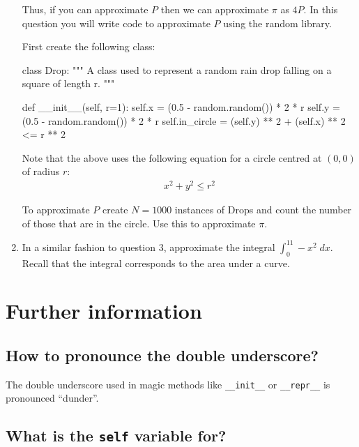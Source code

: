 \begin{enumerate}
Thus, if you can approximate \(P\) then we can approximate \(\pi\) as \(4P\). In this
question you will write code to approximate \(P\) using the random library.


First create the following class:

\begin{pyin}
class Drop:
    """
    A class used to represent a random rain drop falling on a square of
    length r.
    """

    def __init__(self, r=1):
        self.x = (0.5 - random.random()) * 2 * r
        self.y = (0.5 - random.random()) * 2 * r
        self.in_circle = (self.y) ** 2 + (self.x) ** 2 <= r ** 2
\end{pyin}


Note that the above uses the following equation for a circle centred at
\((0,0)\) of radius \(r\):
\begin{equation*}
\begin{split}
       x^2+y^2\leq r^2
   \end{split}
\end{equation*}

To approximate \(P\) create \(N=1000\) instances of Drops and count the
number of those that are in the circle. Use this to approximate \(\pi\).

\item 

In a similar fashion to question 3, approximate the integral
\(\int_{0}^11-x^2\;dx\). Recall that the integral corresponds to the area
under a curve.

\end{enumerate}




\section{Further information}

\subsection{How to pronounce the double underscore?}

The double underscore used in magic methods like \texttt{\_\_init\_\_} or
\texttt{\_\_repr\_\_} is
pronounced ``dunder''.


\subsection{What is the \texttt{self} variable for?}

